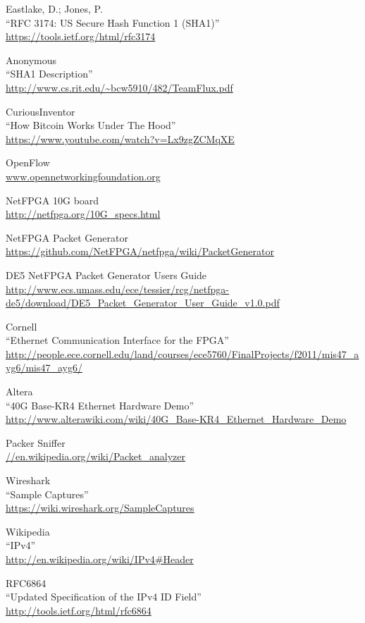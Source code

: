 \begin{thebibliography}{99}
 Eastlake, D.; Jones, P.\\ 
``RFC 3174: US Secure Hash Function 1 (SHA1)''\\
\url{https://tools.ietf.org/html/rfc3174}

 Anonymous\\
``SHA1 Description''\\
\url{http://www.cs.rit.edu/~bcw5910/482/TeamFlux.pdf}

 CuriousInventor\\
``How Bitcoin Works Under The Hood''\\
\url{https://www.youtube.com/watch?v=Lx9zgZCMqXE}

 OpenFlow\\
\url{www.opennetworkingfoundation.org}

 NetFPGA 10G board\\
\url{http://netfpga.org/10G_specs.html}

 NetFPGA Packet Generator\\
\url{https://github.com/NetFPGA/netfpga/wiki/PacketGenerator}

 DE5 NetFPGA Packet Generator Users Guide\\
\url{http://www.ecs.umass.edu/ece/tessier/rcg/netfpga-de5/download/DE5_Packet_Generator_User_Guide_v1.0.pdf}

 Cornell\\
``Ethernet Communication Interface for the FPGA''\\
\url{http://people.ece.cornell.edu/land/courses/ece5760/FinalProjects/f2011/mis47_ayg6/mis47_ayg6/}

 Altera\\
``40G Base-KR4 Ethernet Hardware Demo''\\
\url{http://www.alterawiki.com/wiki/40G_Base-KR4_Ethernet_Hardware_Demo}

 Packer Sniffer\\
\url{//en.wikipedia.org/wiki/Packet_analyzer}

 Wireshark\\
``Sample Captures''\\
\url{https://wiki.wireshark.org/SampleCaptures}

 Wikipedia\\
``IPv4''\\
\url{http://en.wikipedia.org/wiki/IPv4#Header}

 RFC6864\\
``Updated Specification of the IPv4 ID Field''\\
\url{http://tools.ietf.org/html/rfc6864}


\end{thebibliography}

